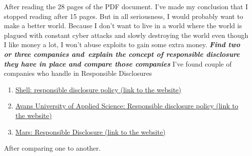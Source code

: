 \documentclass[12pt, letterpaper]{article}
\begin{document}
\hfill\break
\hfill\break
After reading the 28 pages of the PDF document. I've made my conclusion that I stopped reading after 15 pages. But in all seriousness, I would probably want to make a better world. Because I don't want to live in a world where the world is plagued with constant cyber attacks and slowly destroying the world even though I like money a lot, I won't abuse exploits to gain some extra money.
\hfill\break
\hfill\break
\textbf{\emph {Find two or three companies and explain the concept of responsible disclosure they have in place and compare those companies}}
\hfill\break
I've found couple of companies who handle in Responsible Disclosures
\begin{enumerate}
    \item \href{https://www.shell.com/about-us/our-values/shell-global-helpline/responsible-disclosure-policy.html}{Shell: responsible disclosure policy (link to the website)}
    \item \href{https://www.avans.nl/international/about-avans/responsible-disclosure}{Avans University of Applied Science: Responsible disclosure policy (link to the website)}
    \item \href{https://www.mars.com/about/policies-and-practices/responsible-disclosure-policy}{Mars: Responsible Disclosure (link to the website)}
\end{enumerate}
After comparing one to another.
\newpage
\end{document}
